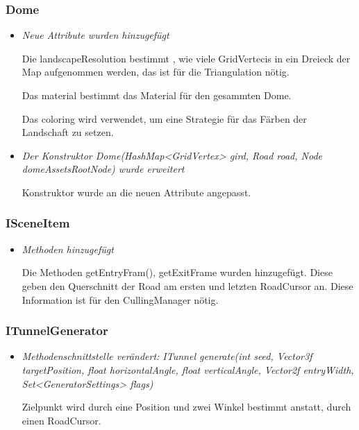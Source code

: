 \subsubsection{Dome}
\begin{itemize}
    \item \textit{Neue Attribute wurden hinzugefügt}
        \begin{leftbar}[0.9\linewidth]
            Die landscapeResolution bestimmt , wie viele GridVertecis in ein Dreieck der Map aufgenommen werden, das ist für die Triangulation
            nötig.\par

            Das material bestimmt das Material für den gesammten Dome.\par

            Das coloring wird verwendet, um eine Strategie für das Färben der Landschaft zu setzen.
        \end{leftbar}

    \item \textit{Der Konstruktor  Dome(HashMap<GridVertex> gird, Road road, Node domeAssetsRootNode) wurde erweitert}
        \begin{leftbar}[0.9\linewidth]
            Konstruktor wurde an die neuen Attribute angepasst.
        \end{leftbar}
    
\end{itemize}







\subsubsection{ISceneItem}
\begin{itemize}
    \item \textit{Methoden hinzugefügt}
        \begin{leftbar}[0.9\linewidth]
            Die Methoden getEntryFram(), getExitFrame wurden hinzugefügt. Diese geben den Querschnitt der Road am ersten und letzten
            RoadCursor an. Diese Information ist für den CullingManager nötig.\par
        \end{leftbar}
\end{itemize}


\subsubsection{ITunnelGenerator}
\begin{itemize}
    \item \textit{Methodenschnittstelle verändert: ITunnel generate(int seed, Vector3f targetPosition, float horizontalAngle, float verticalAngle,
    Vector2f entryWidth, Set<GeneratorSettings> flags)}
        \begin{leftbar}[0.9\linewidth]
            Zielpunkt wird durch eine Position und zwei Winkel bestimmt anstatt, durch einen RoadCursor.\par
        \end{leftbar}
\end{itemize}


